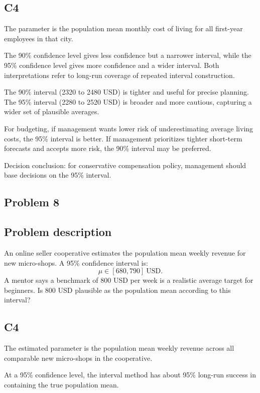 \begin{ExamProblems}
		\subsection*{C4}
		The parameter is the population mean monthly cost of living for all first-year employees in that city.

		The 90\% confidence level gives less confidence but a narrower interval, while the 95\% confidence level gives more confidence and a wider interval.
		Both interpretations refer to long-run coverage of repeated interval construction.

		The 90\% interval (2320 to 2480 USD) is tighter and useful for precise planning.
		The 95\% interval (2280 to 2520 USD) is broader and more cautious, capturing a wider set of plausible averages.

		For budgeting, if management wants lower risk of underestimating average living costs, the 95\% interval is better.
		If management prioritizes tighter short-term forecasts and accepts more risk, the 90\% interval may be preferred.

		Decision conclusion: for conservative compensation policy, management should base decisions on the 95\% interval.

		\newpage
		\item
		\subsection*{Problem 8}
		\subsection*{Problem description}
		An online seller cooperative estimates the population mean weekly revenue for new micro-shops.
		A 95\% confidence interval is:
		\[
		\mu \in [680, 790]\ \text{USD}.
		\]
		A mentor says a benchmark of 800 USD per week is a realistic average target for beginners.
		Is 800 USD plausible as the population mean according to this interval?

		\subsection*{C4}
		The estimated parameter is the population mean weekly revenue across all comparable new micro-shops in the cooperative.

		At a 95\% confidence level, the interval method has about 95\% long-run success in containing the true population mean.


\end{ExamProblems}
